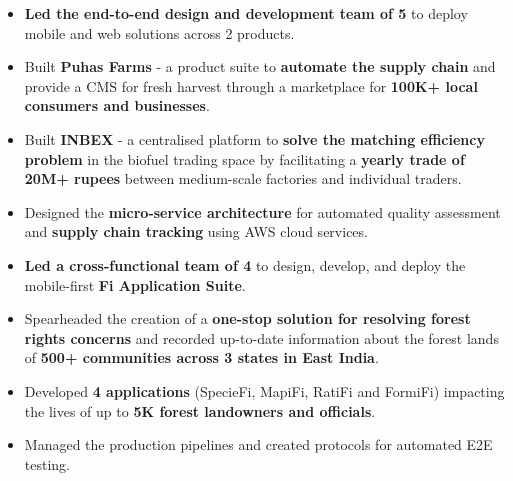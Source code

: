 \documentclass[10pt,a4paper,ragged2e,withhyper]{freycv}
\begin{document}
\begin{paracol}{1}
	\begin{itemize}
		\item \textbf{Led the end-to-end design and development team of 5} to deploy mobile and web solutions across 2 products.
		\item Built \textbf{Puhas Farms} - a product suite to \textbf{automate the supply chain} and provide a CMS for fresh harvest through a marketplace for \textbf{100K+ local consumers and businesses}.
		\item Built \textbf{INBEX} - a centralised platform to \textbf{solve the matching efficiency problem} in the biofuel trading space by facilitating a \textbf{yearly trade of 20M+ rupees} between medium-scale factories and individual traders.
		\item Designed the \textbf{micro-service architecture} for automated quality assessment and \textbf{supply chain tracking} using AWS cloud services.
	\end{itemize}
	
	\medskip
	
	\begin{itemize}
		\item \textbf{Led a cross-functional team of 4} to design, develop, and deploy the mobile-first \textbf{Fi Application Suite}\href{https://github.com/Forest-Economy-Alliance}{\faExternalLink*}.
		\item Spearheaded the creation of a \textbf{one-stop solution for resolving forest rights concerns} and recorded up-to-date information about the forest lands of \textbf{500+ communities across 3 states in East India}.
		\item Developed \textbf{4 applications} (SpecieFi, MapiFi, RatiFi and FormiFi) impacting the lives of up to \textbf{5K forest landowners and officials}.
		\item Managed the production pipelines and created protocols for automated E2E testing.
	\end{itemize}
	

\end{paracol}
\end{document}
